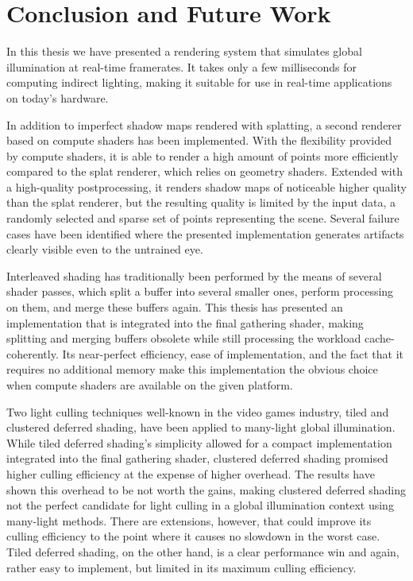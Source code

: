 

\chapter{Conclusion and Future Work}
\label{chap:conclusion}

In this thesis we have presented a rendering system that simulates global illumination at real-time framerates. It takes only a few milliseconds for computing indirect lighting, making it suitable for use in real-time applications on today's hardware.

In addition to imperfect shadow maps rendered with splatting, a second renderer based on compute shaders has been implemented. With the flexibility provided by compute shaders, it is able to render a high amount of points more efficiently compared to the splat renderer, which relies on geometry shaders. Extended with a high-quality postprocessing, it renders shadow maps of noticeable higher quality than the splat renderer, but the resulting quality is limited by the input data, a randomly selected and sparse set of points representing the scene. Several  failure cases have been identified where the presented implementation generates artifacts clearly visible even to the untrained eye.

Interleaved shading has traditionally been performed by the means of several shader passes, which split a buffer into several smaller ones, perform processing on them, and merge these buffers again. This thesis has presented an implementation that is integrated into the final gathering shader, making splitting and merging buffers obsolete while still processing the workload cache-coherently. Its near-perfect efficiency, ease of implementation, and the fact that it requires no additional memory make this implementation the obvious choice when compute shaders are available on the given platform.

Two light culling techniques well-known in the video games industry, tiled and clustered deferred shading, have been applied to many-light global illumination. While tiled deferred shading's simplicity allowed for a compact implementation integrated into the final gathering shader, clustered deferred shading promised higher culling efficiency at the expense of higher overhead. The results have shown this overhead to be not worth the gains, making clustered deferred shading not the perfect candidate for light culling in a global illumination context using many-light methods. There are extensions, however, that could improve its culling efficiency to the point where it causes no slowdown in the worst case. Tiled deferred shading, on the other hand, is a clear performance win and again, rather easy to implement, but limited in its maximum culling efficiency.


